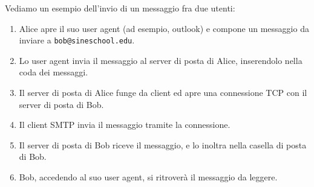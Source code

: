 \documentclass[12pt, letterpaper]{article}
\newcommand{\code}[1]{\colorbox{light-gray}{\texttt{#1}}}
\begin{document}
Vediamo un esempio dell'invio di un messaggio fra due utenti:\begin{enumerate}
    \item Alice apre il suo user agent (ad esempio, outlook) e compone un messaggio da 
    inviare a \code{bob@sineschool.edu}. 
    \item Lo user agent invia il messaggio al server di posta di Alice, inserendolo nella coda dei messaggi.
    \item Il server di posta di Alice funge da client ed apre una connessione TCP con il server di posta 
    di Bob.
    \item Il client SMTP invia il messaggio tramite la connessione. 
    \item Il server di posta di Bob riceve il messaggio, e lo inoltra nella casella di posta di Bob.
    \item Bob, accedendo al suo user agent, si ritroverà il messaggio da leggere.              
\end{enumerate}
\end{document}

